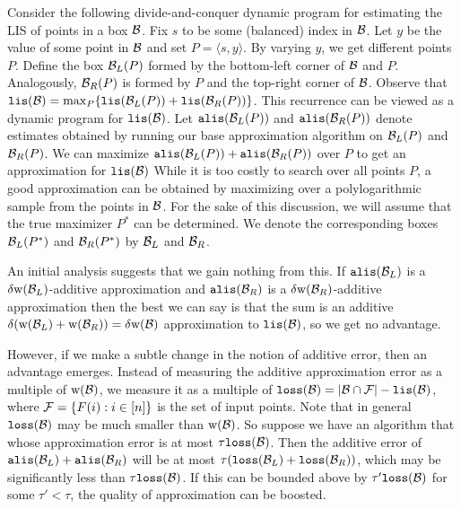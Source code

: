 \documentclass{acmsmall}
\newcommand{\cB}{{\cal B}}
\newcommand{\cF}{{\cal F}}
\newcommand{\lis}{{\tt lis}}
\newcommand{\loss}{{\tt loss}}
\newcommand{\alis}{{\tt alis}}
\newcommand{\width}{{\bf {\rm  w}}}
\begin{document}
Consider the following divide-and-conquer dynamic program for
estimating the LIS of points in a box $\cB$.  
Fix $s$ to be some (balanced) index in $\cB$.
Let $y$ be the value of some point in $\cB$ and set $P = \langle s,y\rangle$.
By varying $y$, we get different points $P$.
Define the box $\cB_{L}(P)$ formed by the bottom-left corner of $\cB$ and $P$.
Analogously, $\cB_{R}(P)$ is formed by $P$ and the top-right corner of $\cB$.
Observe that $\lis(\cB) = \max_P \{\lis(\cB_{L}(P)) + \lis(\cB_{R}(P))\}$.
%
%
This recurrence can be viewed as a  dynamic program for $\lis(\cB)$.
Let $\alis(\cB_{L}(P))$ and $\alis(\cB_{R}(P))$ denote estimates obtained by running our
base approximation algorithm on $\cB_{L}(P)$ and $\cB_{R}(P)$. We can maximize $\alis(\cB_{L}(P))+\alis(\cB_{R}(P))$ over $P$
to get 
an approximation for $\lis(\cB)$ 
While it is too costly to search over all points $P$,
a good approximation can be obtained by maximizing over a polylogarithmic
sample from the points in $\cB$. For the sake of this discussion, we will
assume that the true maximizer $P^*$ can be determined.
We denote the corresponding boxes $\cB_{L}(P^*)$ and $\cB_{R}(P^*)$ by $\cB_L$ and $\cB_R$.

An initial analysis suggests that we gain nothing from this.
If $\alis(\cB_L)$ is a $\delta \width(\cB_L)$-additive approximation and $\alis(\cB_R)$
is a $\delta \width(\cB_R)$-additive approximation then the best we can say is
that the sum is an additive $\delta (\width(\cB_L)+\width(\cB_R))=\delta \width(\cB)$
approximation to $\lis(\cB)$, so we get no advantage.

However, if we make a subtle change in the notion of additive error, then 
an advantage emerges.  
Instead of measuring the additive approximation error
as a multiple of $\width(\cB)$, we measure it as a multiple of $\loss(\cB)=|\cB \cap \cF|-\lis(\cB)$, where $\cF=
\{F(i):i \in [n]\}$ is the set of input points.
Note that in general $\loss(\cB)$
may be much smaller than $\width(\cB)$.  So suppose we have an algorithm that
whose approximation error is at most $\tau \loss(\cB)$.  
Then the additive error of $\alis(\cB_L)+\alis(\cB_R)$ will be at most
$\tau (\loss(\cB_L)+\loss(\cB_R))$, which may be significantly  less than $\tau \loss(\cB)$.
If this can be bounded above by $\tau' \loss(\cB)$ for some $\tau'<\tau$,
the quality of approximation can be boosted.
\end{document}
